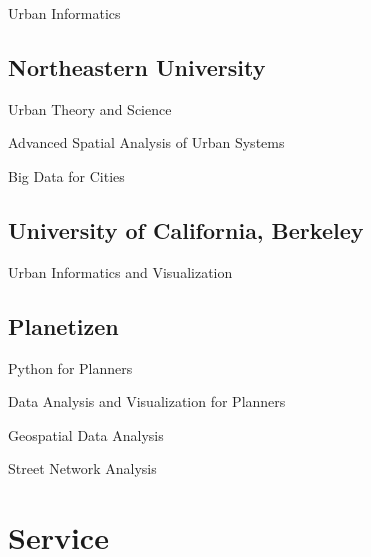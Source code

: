 \documentclass[12pt,letterpaper]{report}
\newcommand{\listitemspace}{0.15em}
\renewenvironment{itemize}
{\begin{list}{}{\setlength{\leftmargin}{0em}
            \setlength{\parskip}{0em}
            \setlength{\itemsep}{\listitemspace}
            \setlength{\parsep}{\listitemspace}}}
    {\end{list}}
\begin{document}
    \begin{itemize}
    	
    	\item Urban Informatics
    
	\end{itemize}
    	
    \subsection*{Northeastern University}

    \begin{itemize}

        \item Urban Theory and Science
        \item Advanced Spatial Analysis of Urban Systems
        \item Big Data for Cities

    \end{itemize}

    \subsection*{University of California, Berkeley}

    \begin{itemize}

        \item Urban Informatics and Visualization

    \end{itemize}

    \subsection*{Planetizen}

    \begin{itemize}

        \item Python for Planners
        \item Data Analysis and Visualization for Planners
        \item Geospatial Data Analysis
        \item Street Network Analysis

    \end{itemize}


    \section*{Service}
\end{document}
